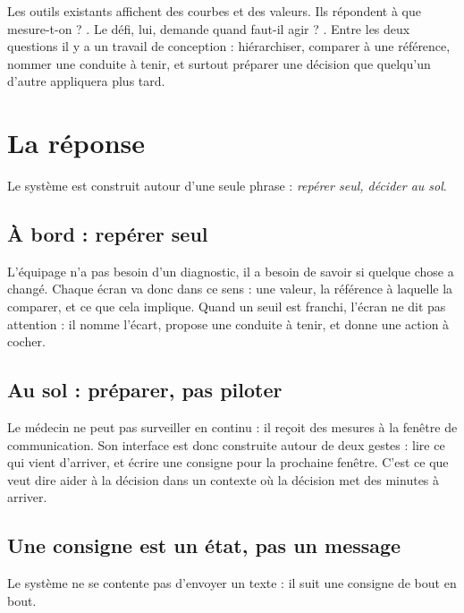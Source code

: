 \documentclass[11pt,a4paper]{article}
\let\sectionorig\section
\renewcommand{\section}{\Needspace{5\baselineskip}\sectionorig}
\begin{document}
Les outils existants affichent des courbes et des valeurs. Ils r\'epondent \`a \og que mesure-t-on ?
\fg{}. Le d\'efi, lui, demande \og quand faut-il agir ? \fg{}. Entre les deux questions il y a un
travail de conception : hi\'erarchiser, comparer \`a une r\'ef\'erence, nommer une conduite \`a tenir,
et surtout pr\'eparer une d\'ecision que quelqu'un d'autre appliquera plus tard.

\section{La r\'eponse}

Le syst\`eme est construit autour d'une seule phrase : \emph{rep\'erer seul, d\'ecider au sol}.

\subsection{\`A bord : rep\'erer seul}

L'\'equipage n'a pas besoin d'un diagnostic, il a besoin de savoir si quelque chose a chang\'e. Chaque
\'ecran va donc dans ce sens : une valeur, la r\'ef\'erence \`a laquelle la comparer, et ce que cela
implique. Quand un seuil est franchi, l'\'ecran ne dit pas \og attention \fg{} : il nomme l'\'ecart,
propose une conduite \`a tenir, et donne une action \`a cocher.

\subsection{Au sol : pr\'eparer, pas piloter}

Le m\'edecin ne peut pas surveiller en continu : il re\c{c}oit des mesures \`a la fen\^etre de
communication. Son interface est donc construite autour de deux gestes : lire ce qui vient d'arriver,
et \'ecrire une consigne pour la prochaine fen\^etre. C'est ce que veut dire \og aider \`a la
d\'ecision \fg{} dans un contexte o\`u la d\'ecision met des minutes \`a arriver.

\subsection{Une consigne est un \'etat, pas un message}

Le syst\`eme ne se contente pas d'envoyer un texte : il suit une consigne de bout en bout.
\end{document}
